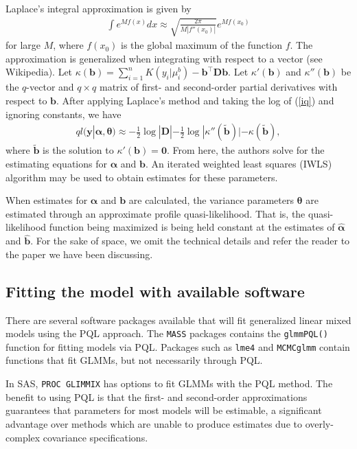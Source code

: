 \documentclass[12pt]{article}
\newcommand{\m}[1]{\mathbf{\bm{#1}}}
\begin{document}
Laplace's integral approximation is given by
\begin{eqnarray}
\int e^{Mf(x)}dx \approx \sqrt{\frac{2\pi}{M|f''(x_0)|}} e^{Mf(x_0)}
\end{eqnarray}
for large $M$, where $f(x_0)$ is the global maximum of the function $f$. The approximation is generalized when integrating with respect to a vector (see Wikipedia). Let $\kappa(\m{b})=\sum_{i=1}^nK(y_i|\mu_i^b)-\m{b}^\top\m{D}\m{b}$. Let $\kappa'(\m{b})$ and $\kappa''(\m{b})$ be the $q$-vector and $q\times q$ matrix of first- and second-order partial derivatives with respect to $\m{b}$. After applying Laplace's method and taking the log of (\ref{iq}) and ignoring constants, we have
\begin{eqnarray}
ql(\m{y}|\m{\alpha},\m{\theta}) \approx -\frac{1}{2}\log|\m{D}| -\frac{1}{2}\log|\kappa''(\tilde{\m{b}})| - \kappa(\tilde{\m{b}}),
\end{eqnarray}
where $\tilde{\m{b}}$ is the solution to $\kappa'(\m{b})=\m{0}$. From here, the authors solve for the estimating equations for $\m{\alpha}$ and $\m{b}$. An iterated weighted least squares (IWLS) algorithm may be used to obtain estimates for these parameters.

When estimates for $\m{\alpha}$ and $\m{b}$ are calculated, the variance parameters $\m{\theta}$ are estimated through an approximate profile quasi-likelihood. That is, the quasi-likelihood function being maximized is being held constant at the estimates of $\hat{\m{\alpha}}$ and $\hat{\m{b}}$. For the sake of space, we omit the technical details and refer the reader to the paper we have been discussing.

\subsection{Fitting the model with available software}

\noindent There are several software packages available that will fit generalized linear mixed models using the PQL approach. The \texttt{MASS} packages contains the \texttt{glmmPQL()} function for fitting models via PQL. Packages such as \texttt{lme4} and \texttt{MCMCglmm} contain functions that fit GLMMs, but not necessarily through PQL.

In SAS, \texttt{PROC GLIMMIX} has options to fit GLMMs with the PQL method. The benefit to using PQL is that the first- and second-order approximations guarantees that parameters for most models will be estimable, a significant advantage over methods which are unable to produce estimates due to overly-complex covariance specifications.
\end{document}
